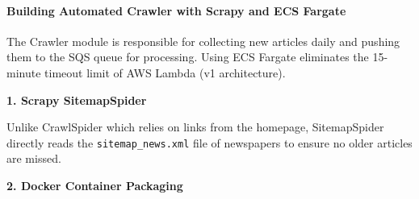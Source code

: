 \hypertarget{building-automated-crawler-with-scrapy-and-ecs-fargate}{%
\paragraph{Building Automated Crawler with Scrapy and ECS
Fargate}}

The Crawler module is responsible for collecting new articles daily and
pushing them to the SQS queue for processing. Using ECS Fargate
eliminates the 15-minute timeout limit of AWS Lambda (v1 architecture).

\textbf{1. Scrapy SitemapSpider}

Unlike CrawlSpider which relies on links from the homepage,
SitemapSpider directly reads the \texttt{sitemap\_news.xml} file of
newspapers to ensure no older articles are missed.

\begin{Shaded}
\begin{Highlighting}[]

\OperatorTok{=} 
    
        
\OperatorTok{=}

\end{Highlighting}
\end{Shaded}

\textbf{2. Docker Container Packaging}

